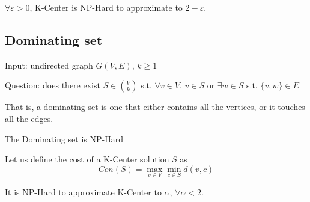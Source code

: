     \begin{theorem}
        $\forall \varepsilon > 0$, K-Center is NP-Hard to approximate to $2 - \varepsilon$.
    \end{theorem}


\subsection{Dominating set}
    Input: undirected graph $G(V,E)$, $k \geq 1$

    Question: does there exist $S \in \binom{V}{k}$ s.t. $\forall v \in V$, $v \in S$ or $\exists w \in S$ s.t. $\{ v,w \} \in E$

    That is, a dominating set is one that either contains all the vertices, or it touches all the edges.

    \begin{theorem}
        The Dominating set is NP-Hard
    \end{theorem}

    Let us define the cost of a K-Center solution $S$ as
    \[ Cen(S) = \max_{v \in V} \min_{c \in S} d(v,c) \]

    \begin{theorem}
        It is NP-Hard to approximate K-Center to $\alpha$, $\forall \alpha < 2$.
    \end{theorem}

